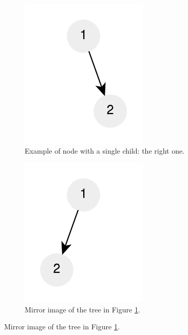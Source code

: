 \begin{figure}
	\begin{subfigure}[b]{0.4\textwidth}
		\includegraphics[]{sources/mirror_binary_tree/images/tree_only_right_child}
		\caption{Example of node with a single child: the right one.}
		\label{fig:mirro_binary_tree:single_right}
	 \end{subfigure}
	 \hfill
	 \begin{subfigure}[b]{0.4\textwidth}
		\includegraphics[]{sources/mirror_binary_tree/images/tree_only_right_child_mirror}
		\caption{Mirror image of the tree in Figure \ref{fig:mirro_binary_tree:single_right}.}
		\label{fig:mirro_binary_tree:single_right_mirror}
	 \end{subfigure}


\end{figure}
